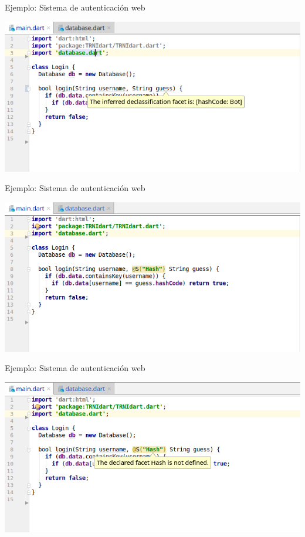 \documentclass[aspectratio=169,10pt]{beamer}
\begin{document}
\begin{frame}[fragile]{Ejemplo: Sistema de autenticación web}
	\begin{center}
		\includegraphics[width=1.0\textwidth]{images/login2.png}
	\end{center}
\end{frame}

\begin{frame}[fragile]{Ejemplo: Sistema de autenticación web}
	\begin{center}
		\includegraphics[width=1.0\textwidth]{images/login25.png}
	\end{center}
\end{frame}

\begin{frame}[fragile]{Ejemplo: Sistema de autenticación web}
	\begin{center}
		\includegraphics[width=1.0\textwidth]{images/login3.png}
	\end{center}
\end{frame}
\end{document}
